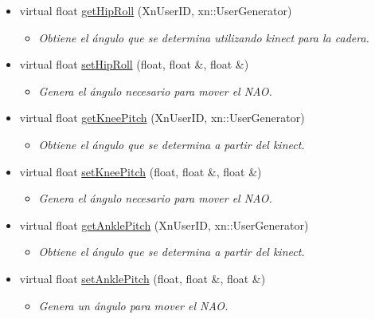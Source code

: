 \begin{itemize}
\item 
virtual float \hyperlink{class_l_leg_ac0d2147e72701ad8202b758bb572735f}{get\-Hip\-Roll} (\-Xn\-User\-I\-D, xn\-::\-User\-Generator)
\begin{itemize}\small\item\em \-Obtiene el ángulo que se determina utilizando kinect para la cadera. \end{itemize}\item 
\hypertarget{class_l_leg_a200afc21f99236f2af57b95ea648573b}{virtual float \hyperlink{class_l_leg_a200afc21f99236f2af57b95ea648573b}{set\-Hip\-Roll} (float, float \&, float \&)}\label{class_l_leg_a200afc21f99236f2af57b95ea648573b}

\begin{itemize}\small\item\em \-Genera el ángulo necesario para mover el \-N\-A\-O. \end{itemize}\item 
\hypertarget{class_l_leg_a4a31233e6def8edde81e5d694b7e0feb}{virtual float \hyperlink{class_l_leg_a4a31233e6def8edde81e5d694b7e0feb}{get\-Knee\-Pitch} (\-Xn\-User\-I\-D, xn\-::\-User\-Generator)}\label{class_l_leg_a4a31233e6def8edde81e5d694b7e0feb}

\begin{itemize}\small\item\em \-Obtiene el ángulo que se determina a partir del kinect. \end{itemize}\item 
\hypertarget{class_l_leg_a15417e9792bbc9a2f398ed9127e3db11}{virtual float \hyperlink{class_l_leg_a15417e9792bbc9a2f398ed9127e3db11}{set\-Knee\-Pitch} (float, float \&, float \&)}\label{class_l_leg_a15417e9792bbc9a2f398ed9127e3db11}

\begin{itemize}\small\item\em \-Genera el ángulo necesario para mover el \-N\-A\-O. \end{itemize}\item 
\hypertarget{class_l_leg_a85ec581c8db5d113a13be644a851753e}{virtual float \hyperlink{class_l_leg_a85ec581c8db5d113a13be644a851753e}{get\-Ankle\-Pitch} (\-Xn\-User\-I\-D, xn\-::\-User\-Generator)}\label{class_l_leg_a85ec581c8db5d113a13be644a851753e}

\begin{itemize}\small\item\em \-Obtiene el ángulo que se determina a partir del kinect. \end{itemize}\item 
\hypertarget{class_l_leg_ab474375cb60e68fbf5790459b690b42f}{virtual float \hyperlink{class_l_leg_ab474375cb60e68fbf5790459b690b42f}{set\-Ankle\-Pitch} (float, float \&, float \&)}\label{class_l_leg_ab474375cb60e68fbf5790459b690b42f}

\begin{itemize}\small\item\em \-Genera un ángulo para mover el \-N\-A\-O. \end{itemize}\end{itemize}


